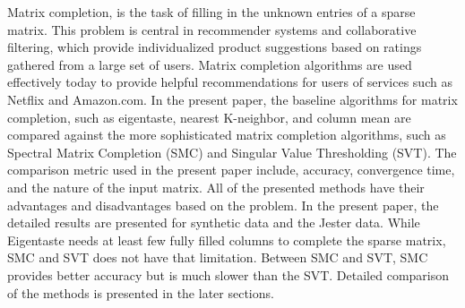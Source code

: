 Matrix completion, is the task of filling in the unknown entries of a sparse matrix. This problem is central in recommender systems and collaborative filtering, which provide individualized product suggestions based on ratings gathered from a large set of users. Matrix completion algorithms are used effectively today to provide helpful recommendations for users of services such as Netflix and Amazon.com. In the present paper, the baseline algorithms for matrix completion, such as eigentaste, nearest K-neighbor, and column mean are compared against the more sophisticated matrix completion algorithms, such as Spectral Matrix Completion (SMC) and Singular Value Thresholding (SVT). The comparison metric used in the present paper include, accuracy, convergence time, and the nature of the input matrix. All of the presented methods have their advantages and disadvantages based on the problem. In the present paper, the detailed results are presented for synthetic data and the Jester data. While Eigentaste needs at least few fully filled columns to complete the sparse matrix, SMC and SVT does not have that limitation. Between SMC and SVT, SMC provides better accuracy but is much slower than the SVT. Detailed comparison of the methods is presented in the later sections.
